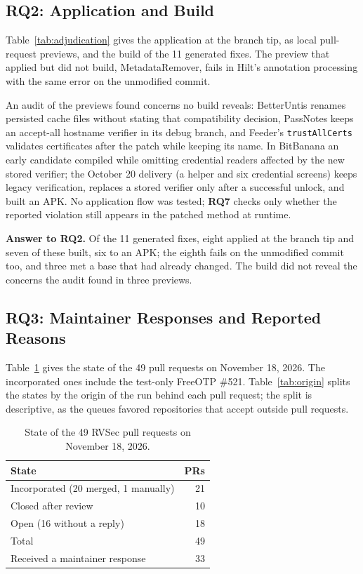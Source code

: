 \documentclass[conference]{IEEEtran}
\newcommand{\researchq}[1]{\textbf{RQ#1}}
\begin{document}
\subsection{\researchq{2}: Application and Build}
\label{subsec:rq2}

Table~\ref{tab:adjudication} gives the application at the branch tip, as local
pull-request previews, and the build of the 11 generated fixes. The preview
that applied but did not build, MetadataRemover, fails in Hilt's annotation
processing with the same error on the unmodified commit.

An audit of the previews found concerns no build reveals: BetterUntis renames
persisted cache files without stating that compatibility decision, PassNotes
keeps an accept-all hostname verifier in its debug branch, and Feeder's
\texttt{trustAllCerts} validates certificates after the patch while keeping
its name. In BitBanana an early candidate compiled while omitting credential
readers affected by the new stored verifier; the October 20 delivery (a
helper and six credential screens) keeps legacy verification, replaces a
stored verifier only after a successful unlock, and built an APK. No
application flow was tested; \researchq{7} checks only whether the reported
violation still appears in the patched method at runtime.

\textbf{Answer to \researchq{2}.} Of the 11 generated fixes, eight applied at
the branch tip and seven of these built, six to an APK; the eighth fails on the
unmodified commit too, and three met a base that had already changed. The build
did not reveal the concerns the audit found in three previews.

\subsection{\researchq{3}: Maintainer Responses and Reported Reasons}
\label{subsec:rq3}

Table~\ref{tab:pr-state} gives the state of the 49 pull requests on November
18, 2026. The incorporated ones include the test-only FreeOTP \#521. Table~\ref{tab:origin} splits
the states by the origin of the run behind each pull request; the split is
descriptive, as the queues favored repositories that accept outside pull
requests.

\begin{table}[H]
\centering
\caption{State of the 49 RVSec pull requests on November 18, 2026.}
\label{tab:pr-state}
\begin{tabular}{lr}
\toprule
State & PRs \\
\midrule
Incorporated (20 merged, 1 manually) & 21 \\
Closed after review                  & 10 \\
Open (16 without a reply)            & 18 \\
\midrule
Total                                & 49 \\
Received a maintainer response       & 33 \\
\bottomrule
\end{tabular}
\end{table}
\end{document}
